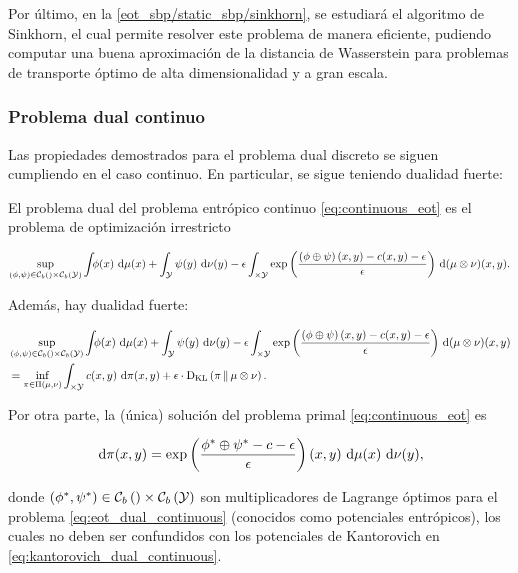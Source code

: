 Por último, en la \autoref{eot_sbp/static_sbp/sinkhorn}, se estudiará el algoritmo de Sinkhorn, el cual permite resolver este problema de manera eficiente, pudiendo computar una buena aproximación de la distancia de Wasserstein para problemas de transporte óptimo de alta dimensionalidad y a gran escala.

\subsubsection{Problema dual continuo}

Las propiedades demostrados para el problema dual discreto se siguen cumpliendo en el caso continuo. En particular, se sigue teniendo dualidad fuerte:

\begin{prop}
	El problema dual del problema entrópico continuo \eqref{eq:continuous_eot} es el problema de optimización irrestricto

	\begin{equation}
		\label{eq:eot_dual_continuous}
		\sup_{(\phi,\psi)\in \mathcal{C}_b\left(\right)\times \mathcal{C}_b\left(\mathcal{Y}\right)}
		\int_{} \phi(x) \,\operatorname{d}\!\mu(x) + \int_{\mathcal{Y}} \psi(y) \,\operatorname{d}\!\nu(y)
		- \epsilon \int_{\times\mathcal{Y}} \exp\left(\frac{\left(\phi\oplus\psi\right)(x,y) - c(x,y) - \epsilon}{\epsilon}\right) \,\operatorname{d}\!\,(\mu\otimes\nu)(x,y).
	\end{equation}

	Además, hay dualidad fuerte:

	\begin{align*}
		 & \sup_{(\phi,\psi)\in \mathcal{C}_b\left(\right)\times \mathcal{C}_b\left(\mathcal{Y}\right)}
		 \int_{} \phi(x) \,\operatorname{d}\!\mu(x) + \int_{\mathcal{Y}} \psi(y) \,\operatorname{d}\!\nu(y)
		 - \epsilon \int_{\times\mathcal{Y}} \exp\left(\frac{\left(\phi\oplus\psi\right)(x,y) - c(x,y) - \epsilon}{\epsilon}\right) \,\operatorname{d}\!\,(\mu\otimes\nu)(x,y) \\
		 & =\inf_{\pi\in\Pi(\mu,\nu)}  \int_{\times\mathcal{Y}} c(x,y) \,\operatorname{d}\!\pi(x,y) + \epsilon\cdot \operatorname{D_{KL}}\left(\pi\,\|\,\mu\otimes\nu\right) .
	\end{align*}

	Por otra parte, la (única) solución del problema primal \eqref{eq:continuous_eot} es

	\begin{equation*}
		\,\operatorname{d}\!\pi(x,y) = \exp\left(\frac{\phi^* \oplus \psi^* - c - \epsilon}{\epsilon}\right)(x,y) \,\operatorname{d}\!\mu(x)\,\operatorname{d}\!\nu(y),
	\end{equation*}

	donde $(\phi^*,\psi^*)\in \mathcal{C}_b\left(\right)\times \mathcal{C}_b\left(\mathcal{Y}\right)$ son multiplicadores de Lagrange óptimos para el problema \eqref{eq:eot_dual_continuous} (conocidos como potenciales entrópicos), los cuales no
	deben ser confundidos con los potenciales de Kantorovich en \eqref{eq:kantorovich_dual_continuous}.
\end{prop}

